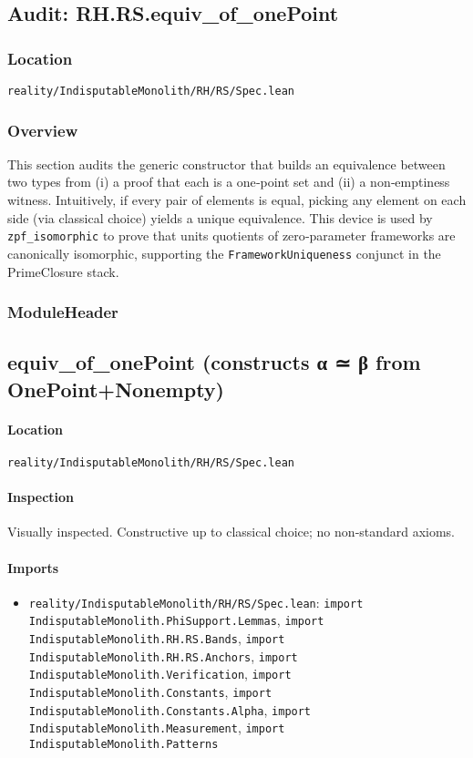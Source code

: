 \documentclass{article}
\newcommand{\FileRef}[1]{\texttt{#1}}
\newcommand{\ModuleHeader}[3]{%
  \subsection{#1}
  \paragraph{Location} \FileRef{#2}\\
  \paragraph{Inspection} #3
}
\begin{document}
\subsection{Audit: RH.RS.equiv\_of\_onePoint}
\subsubsection{Location}
\FileRef{reality/IndisputableMonolith/RH/RS/Spec.lean}

\subsubsection{Overview}
This section audits the generic constructor that builds an equivalence between two types from (i) a proof that each is a one‑point set and (ii) a non‑emptiness witness. Intuitively, if every pair of elements is equal, picking any element on each side (via classical choice) yields a unique equivalence. This device is used by \texttt{zpf\_isomorphic} to prove that units quotients of zero‑parameter frameworks are canonically isomorphic, supporting the \texttt{FrameworkUniqueness} conjunct in the PrimeClosure stack.

\subsubsection{ModuleHeader}
\ModuleHeader{equiv\_of\_onePoint (constructs α ≃ β from OnePoint+Nonempty)}{reality/IndisputableMonolith/RH/RS/Spec.lean}{Visually inspected. Constructive up to classical choice; no non‑standard axioms.}

\paragraph{Imports}
\begin{itemize}[leftmargin=*]
  \item \FileRef{reality/IndisputableMonolith/RH/RS/Spec.lean}: \texttt{import IndisputableMonolith.PhiSupport.Lemmas}, \texttt{import IndisputableMonolith.RH.RS.Bands}, \texttt{import IndisputableMonolith.RH.RS.Anchors}, \texttt{import IndisputableMonolith.Verification}, \texttt{import IndisputableMonolith.Constants}, \texttt{import IndisputableMonolith.Constants.Alpha}, \texttt{import IndisputableMonolith.Measurement}, \texttt{import IndisputableMonolith.Patterns}
\end{itemize}
\end{document}
